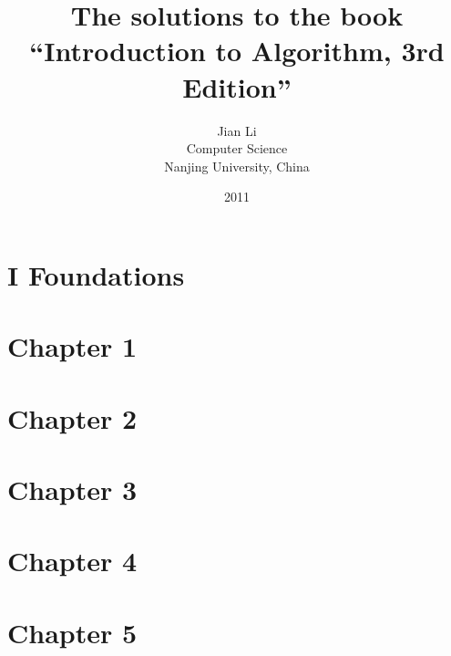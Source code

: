 \documentclass[12pt,a4paper]{article}
\begin{document}
\title{The solutions to the book \\ ``Introduction to Algorithm, 3rd Edition''}
\author{Jian Li \\ Computer Science \\ Nanjing University, China}
\date{2011}
\maketitle
\pagebreak

\section*{I Foundations}
\pagebreak

\section*{Chapter 1}



\pagebreak

\section*{Chapter 2}






\pagebreak


\section*{Chapter 3}








\pagebreak


\section*{Chapter 4}








\pagebreak


\section*{Chapter 5}
\end{document}
